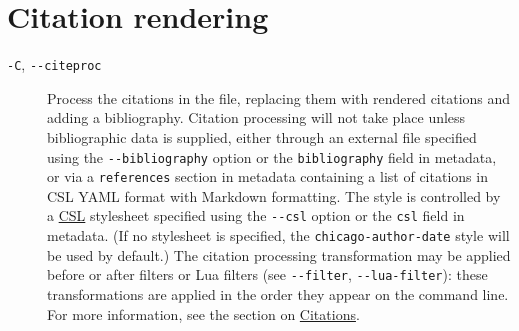 \documentclass[
  b5paper
]{book}
\begin{document}
\section{Citation rendering}\label{citation-rendering}

\begin{description}
\item[\texttt{-C}, \texttt{-\/-citeproc}]
Process the citations in the file, replacing them with rendered
citations and adding a bibliography. Citation processing will not take
place unless bibliographic data is supplied, either through an external
file specified using the \texttt{-\/-bibliography} option or the
\texttt{bibliography} field in metadata, or via a \texttt{references}
section in metadata containing a list of citations in CSL YAML format
with Markdown formatting. The style is controlled by a
\href{https://docs.citationstyles.org/en/stable/specification.html}{CSL}
stylesheet specified using the \texttt{-\/-csl} option or the
\texttt{csl} field in metadata. (If no stylesheet is specified, the
\texttt{chicago-author-date} style will be used by default.) The
citation processing transformation may be applied before or after
filters or Lua filters (see \texttt{-\/-filter},
\texttt{-\/-lua-filter}): these transformations are applied in the order
they appear on the command line. For more information, see the section
on \hyperref[citations]{Citations}.


\end{description}
\end{document}
